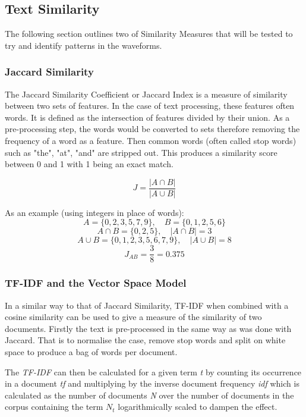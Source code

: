 \documentclass[../report.tex]{subfiles}
\begin{document}
\subsection{Text Similarity}

	The following section outlines two of Similarity Measures that will be tested to try and identify patterns in the waveforms.

\subsubsection{Jaccard Similarity} \label{sec:bkg-jaccard}

	The Jaccard Similarity Coefficient or Jaccard Index is a measure of similarity between two sets of features.  In the case of text processing, these features often words.  It is defined as the intersection of features divided by their union.  As a pre-processing step, the words would be converted to sets therefore removing the frequency of a word as a feature.  Then common words (often called stop words) such as "the", "at", "and" are stripped out.  This produces a similarity score between 0 and 1 with 1 being an exact match.
	
	$$
	J = \frac{|A \cap B|}{|A \cup B|}
	$$
	
	As an example (using integers in place of words):
	$$ A = \{0, 2, 3, 5, 7, 9\},\quad B = \{0, 1, 2, 5, 6\} $$
	$$ A\cap B = \{0, 2, 5\},\quad |A\cap B| = 3 $$
	$$ A\cup B = \{0, 1, 2, 3, 5, 6, 7, 9\},\quad |A\cup B| = 8	$$
	$$ J_{AB} = \frac{3}{8} = 0.375 $$

\subsubsection{TF-IDF and the Vector Space Model}
	
	In a similar way to that of Jaccard Similarity, TF-IDF when combined with a cosine similarity can be used to give a measure of the similarity of two documents.  Firstly the text is pre-processed in the same way as was done with Jaccard.  That is to normalise the case, remove stop words and split on white space to produce a bag of words per document.
	
	The \textit{TF-IDF} can then be calculated for a given term \textit{t} by counting its occurrence in a document \textit{tf} and multiplying by the inverse document frequency \textit{idf} which is calculated as the number of documents \textit{N} over the number of documents in the corpus containing the term \textit{$N_{t}$} logarithmically scaled to dampen the effect.
	
\end{document}

